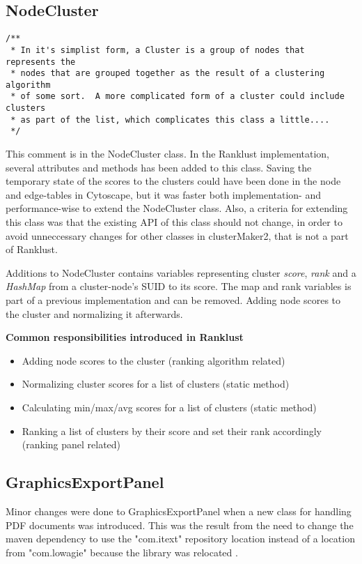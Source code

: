 \subsection{NodeCluster}
\begin{Verbatim}[fontsize=\scriptsize]
/**
 * In it's simplist form, a Cluster is a group of nodes that represents the
 * nodes that are grouped together as the result of a clustering algorithm
 * of some sort.  A more complicated form of a cluster could include clusters
 * as part of the list, which complicates this class a little....
 */
\end{Verbatim}

This comment is in the NodeCluster class. In the Ranklust implementation,
several attributes and methods has been added to this class. Saving the
temporary state of the scores to the clusters could have been done in the node
and edge-tables in Cytoscape, but it was faster both implementation- and
performance-wise to extend the NodeCluster class. Also, a criteria for extending
this class was that the existing API of this class should not change, in order
to avoid unneccessary changes for other classes in clusterMaker2, that is not
a part of Ranklust. 

Additions to NodeCluster contains variables representing cluster \textit{score},
\textit{rank} and a \textit{HashMap} from a cluster-node's SUID to its score.
The map and rank variables is part of a previous implementation and can be
removed. Adding node scores to the cluster and normalizing it afterwards.

\textbf{Common responsibilities introduced in Ranklust}
\begin{itemize}
    \item Adding node scores to the cluster (ranking algorithm related)
    \item Normalizing cluster scores for a list of clusters (static method)
    \item Calculating min/max/avg scores for a list of clusters (static method)
    \item Ranking a list of clusters by their score and set their rank
        accordingly (ranking panel related)
\end{itemize}

\subsection{GraphicsExportPanel}
Minor changes were done to GraphicsExportPanel when a new class for handling PDF
documents was introduced. This was the result from the need to change the maven
dependency to use the "com.itext"\cite{itext} repository location instead of
a location from "com.lowagie" because the library was relocated
\cite{lowagie-to-itext}.

